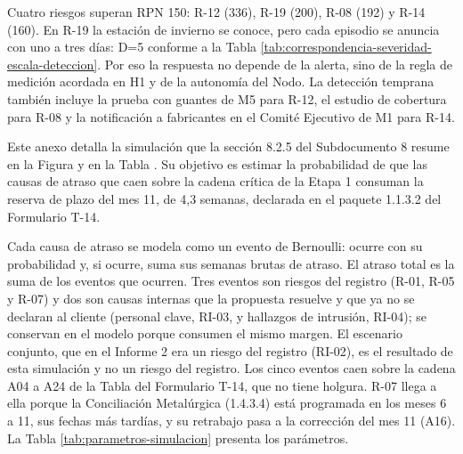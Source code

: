 \documentclass[anexo]{../../comun/overfore}
\begin{document}
Cuatro riesgos superan RPN 150: R-12 (336), R-19 (200), R-08 (192) y R-14 (160). En R-19 la estación de invierno se conoce, pero cada episodio se anuncia con uno a tres días: D=5 conforme a la Tabla \ref{tab:correspondencia-severidad-escala-deteccion}. Por eso la respuesta no depende de la alerta, sino de la regla de medición acordada en H1 y de la autonomía del Nodo. La detección temprana también incluye la prueba con guantes de M5 para R-12, el estudio de cobertura para R-08 y la notificación a fabricantes en el Comité Ejecutivo de M1 para R-14.

Este anexo detalla la simulación que la sección 8.2.5 del Subdocumento 8 resume en la Figura  y en la Tabla . Su objetivo es estimar la probabilidad de que las causas de atraso que caen sobre la cadena crítica de la Etapa 1 consuman la reserva de plazo del mes 11, de 4,3 semanas, declarada en el paquete 1.1.3.2 del Formulario T-14.

Cada causa de atraso se modela como un evento de Bernoulli: ocurre con su probabilidad y, si ocurre, suma sus semanas brutas de atraso. El atraso total es la suma de los eventos que ocurren. Tres eventos son riesgos del registro (R-01, R-05 y R-07) y dos son causas internas que la propuesta resuelve y que ya no se declaran al cliente (personal clave, RI-03, y hallazgos de intrusión, RI-04); se conservan en el modelo porque consumen el mismo margen. El escenario conjunto, que en el Informe 2 era un riesgo del registro (RI-02), es el resultado de esta simulación y no un riesgo del registro. Los cinco eventos caen sobre la cadena A04 a A24 de la Tabla  del Formulario T-14, que no tiene holgura. R-07 llega a ella porque la Conciliación Metalúrgica (1.4.3.4) está programada en los meses 6 a 11, sus fechas más tardías, y su retrabajo pasa a la corrección del mes 11 (A16). La Tabla \ref{tab:parametros-simulacion} presenta los parámetros.
\end{document}
